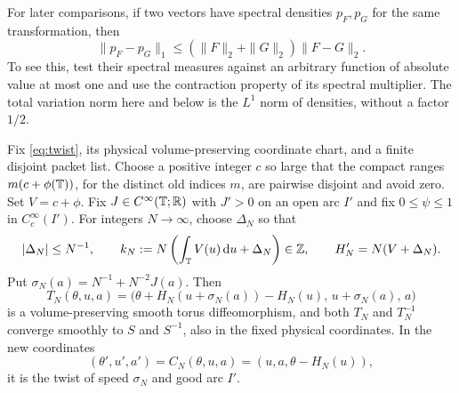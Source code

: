 For later comparisons, if two vectors have spectral densities $p_F,p_G$
for the same transformation, then
\begin{equation}\label{eq:density-norm-bound}
 \|p_F-p_G\|_1
 \le (\|F\|_2+\|G\|_2)\|F-G\|_2.
\end{equation}
To see this, test their spectral measures against an arbitrary function
of absolute value at most one and use the contraction property of its
spectral multiplier. The total variation norm here and below is the
$L^1$ norm of densities, without a factor $1/2$.

\begin{lemma}[Passage]\label{lem:passage}
Fix \eqref{eq:twist}, its physical volume-preserving coordinate chart,
and a finite disjoint packet list. Choose a positive integer $c$ so large
that the compact ranges $m(c+\phi(\mathbb T))$, for the distinct old indices $m$,
are pairwise disjoint and avoid zero. Set $V=c+\phi$.
Fix $J\in C^\infty(\mathbb T;\mathbb R)$ with $J'>0$ on an open arc $I'$ and fix
$0\le\psi\le1$ in $C_c^\infty(I')$.
For integers $N\to\infty$, choose $\Delta_N$ so that
\begin{equation}\label{eq:passage-rounding}
 |\Delta_N|\le N^{-1},\qquad
 k_N:=N\left(\int_\mathbb T V(u)\,\mathrm d u+\Delta_N\right)\in\mathbb Z,
 \qquad H_N'=N(V+\Delta_N).
\end{equation}
Put $\sigma_N(a)=N^{-1}+N^{-2}J(a)$. Then
\begin{equation}\label{eq:passage-map}
 T_N(\theta,u,a)=
 \bigl(\theta+H_N(u+\sigma_N(a))-H_N(u),\,
 u+\sigma_N(a),\,a\bigr)
\end{equation}
is a volume-preserving smooth torus diffeomorphism, and both $T_N$ and
$T_N^{-1}$ converge smoothly to $S$ and $S^{-1}$, also in the fixed
physical coordinates. In the new coordinates
\begin{equation}\label{eq:passage-chart}
 (\theta',u',a')=C_N(\theta,u,a)
             =(u,a,\theta-H_N(u)),
\end{equation}
it is the twist of speed $\sigma_N$ and good arc $I'$.


\end{lemma}
